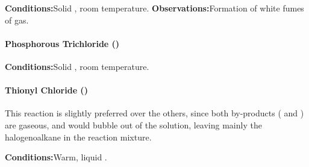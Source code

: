 				\vspace{1.5em}
				\vbox{\textbf{Conditions:}\tabto{35mm}Solid , room temperature.}
				\vbox{\textbf{Observations:}\tabto{35mm}Formation of white fumes of  gas.}



				\paragraph{Phosphorous Trichloride ()}

				\vspace{1.5em}
				\vbox{\textbf{Conditions:}\tabto{35mm}Solid , room temperature.}


				\pagebreak
				\paragraph{Thionyl Chloride ()}

				This reaction is slightly preferred over the others, since both by-products ( and ) are
				gaseous, and would bubble out of the solution, leaving mainly the halogenoalkane in the reaction mixture.

				\vspace{1.5em}
				\vbox{\textbf{Conditions:}\tabto{35mm}Warm, liquid .}

